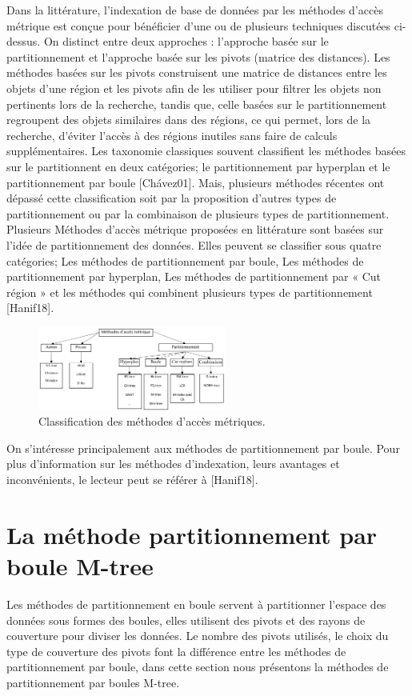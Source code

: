 Dans la littérature, l’indexation de base de données par les méthodes d’accès métrique est conçue pour bénéficier d’une ou de plusieurs techniques discutées ci-dessus. On distinct entre deux approches : l’approche basée sur le partitionnement et l’approche basée sur les pivots (matrice des distances). Les méthodes basées sur les pivots construisent une matrice de distances entre les objets d’une région et les pivots afin de les utiliser pour filtrer les objets non pertinents lors de la recherche, tandis que, celle basées sur le partitionnement regroupent des objets similaires dans des régions, ce qui permet, lors de la recherche, d’éviter l’accès à des régions inutiles sans faire de calculs supplémentaires. Les taxonomie classiques souvent classifient les méthodes basées sur le partitionnent en deux catégories; le partitionnement par hyperplan et le partitionnement par boule [Chávez01]. Mais, plusieurs méthodes récentes ont dépassé cette classification soit par la proposition d’autres types de partitionnement ou par la combinaison de plusieurs types de partitionnement. \\

Plusieurs Méthodes d’accès métrique proposées en littérature sont basées sur l’idée de partitionnement des données. Elles peuvent se classifier sous quatre catégories; Les méthodes de partitionnement par boule, Les méthodes de partitionnement par hyperplan, Les méthodes de partitionnement par « Cut région » et les méthodes qui combinent plusieurs types de partitionnement [Hanif18].
\begin{figure}[H]
	\centering
	\includegraphics[width=0.55\textwidth]{Figures/class.png} %
	\caption{ Classification des méthodes d’accès métriques.}
\end{figure}
On s'intéresse principalement aux méthodes de partitionnement par boule.
Pour plus d'information sur les méthodes d'indexation, leurs avantages et inconvénients, le lecteur peut se référer à [Hanif18].
\section{La méthode partitionnement par boule M-tree}
Les méthodes de partitionnement en boule servent à partitionner l'espace des données sous formes des boules, elles utilisent des pivots et des rayons de couverture pour diviser les données. Le nombre des pivots utilisés, le choix du type de couverture des pivots font la différence entre les méthodes de partitionnement par boule, dans cette section nous présentons la méthodes de partitionnement par boules M-tree.

